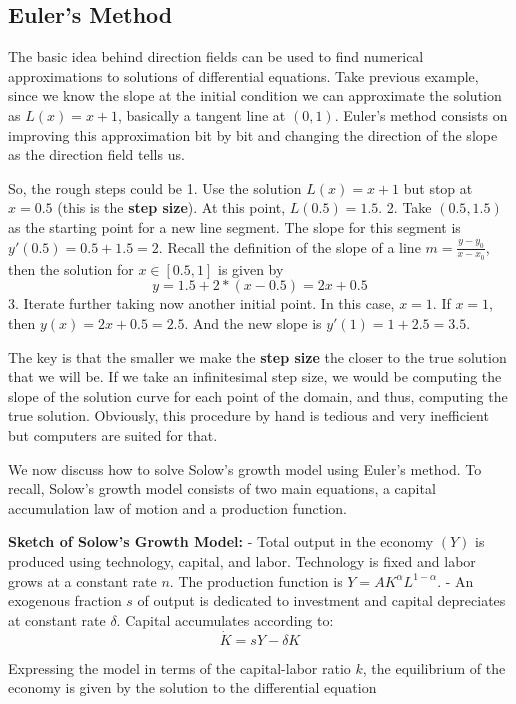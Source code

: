 \documentclass[11pt]{article}
\begin{document}
    \hypertarget{eulers-method}{%
\subsection{Euler's Method}\label{eulers-method}}

The basic idea behind direction fields can be used to find numerical
approximations to solutions of differential equations. Take previous
example, since we know the slope at the initial condition we can
approximate the solution as \(L(x) = x + 1\), basically a tangent line
at \((0, 1)\). Euler's method consists on improving this approximation
bit by bit and changing the direction of the slope as the direction
field tells us.

So, the rough steps could be 1. Use the solution \(L(x) = x + 1\) but
stop at \(x = 0.5\) (this is the \textbf{step size}). At this point,
\(L(0.5) = 1.5\). 2. Take \((0.5, 1.5)\) as the starting point for a new
line segment. The slope for this segment is \(y'(0.5) = 0.5 + 1.5 = 2\).
Recall the definition of the slope of a line
\(m = \frac{y - y_0}{x - x_0}\), then the solution for \(x\in[0.5,1]\)
is given by \[
y = 1.5 + 2*(x-0.5) = 2x + 0.5
\] 3. Iterate further taking now another initial point. In this case,
\(x = 1\). If \(x = 1\), then \(y(x) = 2x +0.5 =2.5\). And the new slope
is \(y'(1) = 1 + 2.5 = 3.5\).

The key is that the smaller we make the \textbf{step size} the closer to
the true solution that we will be. If we take an infinitesimal step
size, we would be computing the slope of the solution curve for each
point of the domain, and thus, computing the true solution. Obviously,
this procedure by hand is tedious and very inefficient but computers are
suited for that.

We now discuss how to solve Solow's growth model using Euler's method.
To recall, Solow's growth model consists of two main equations, a
capital accumulation law of motion and a production function.

\textbf{Sketch of Solow's Growth Model:} - Total output in the economy
\((Y)\) is produced using technology, capital, and labor. Technology is
fixed and labor grows at a constant rate \(n\). The production function
is \(Y = AK^{\alpha}L^{1-\alpha}\). - An exogenous fraction \(s\) of
output is dedicated to investment and capital depreciates at constant
rate \(\delta\). Capital accumulates according to: \[
\dot{K} = sY - \delta K
\]

Expressing the model in terms of the capital-labor ratio \(k\), the
equilibrium of the economy is given by the solution to the differential
equation
\end{document}
